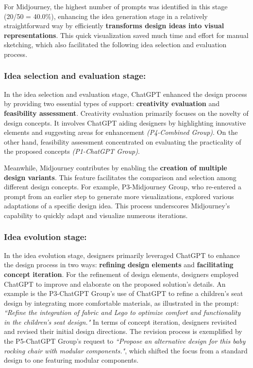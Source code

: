 \documentclass{dsj}
\begin{document}
For Midjourney, the highest number of prompts was identified in this stage (20/50 = 40.0\%), enhancing the idea generation stage in a relatively straightforward way by efficiently \textbf{transforms design ideas into visual representations}. This quick visualization saved much time and effort for manual sketching, which also facilitated the following idea selection and evaluation process.

\subsubsection{Idea selection and evaluation stage:}
In the idea selection and evaluation stage, ChatGPT enhanced the design process by providing two essential types of support: \textbf{creativity evaluation} and \textbf{feasibility assessment}. Creativity evaluation primarily focuses on the novelty of design concepts. It involves ChatGPT aiding designers by highlighting innovative elements and suggesting areas for enhancement \textit{(P4-Combined Group)}. On the other hand, feasibility assessment concentrated on evaluating the practicality of the proposed concepts \textit{(P1-ChatGPT Group)}. 

Meanwhile, Midjourney contributes by enabling the \textbf{creation of multiple design variants}. This feature facilitates the comparison and selection among different design concepts. For example, P3-Midjourney Group, who re-entered a prompt from an earlier step to generate more visualizations, explored various adaptations of a specific design idea. This process underscores Midjourney’s capability to quickly adapt and visualize numerous iterations.

\subsubsection{Idea evolution stage:}
In the idea evolution stage, designers primarily leveraged ChatGPT to enhance the design process in two ways: \textbf{refining design elements} and \textbf{facilitating concept iteration}. For the refinement of design elements, designers employed ChatGPT to improve and elaborate on the proposed solution's details. An example is the P3-ChatGPT Group's use of ChatGPT to refine a children's seat design by integrating more comfortable materials, as illustrated in the prompt: \textit{``Refine the integration of fabric and Lego to optimize comfort and functionality in the children's seat design."} In terms of concept iteration, designers revisited and revised their initial design directions. The revision process is exemplified by the P5-ChatGPT Group’s request to \textit{``Propose an alternative design for this baby rocking chair with modular components."}, which shifted the focus from a standard design to one featuring modular components.
\end{document}
